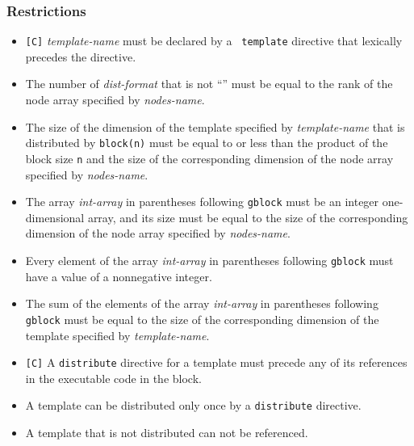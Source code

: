 \subsubsection*{Restrictions}

\begin{itemize}
 \item \verb![C]! {\it template-name} must be declared by a {\tt
       template} directive that lexically precedes the directive.
 \item The number of {\it dist-format} that is not ``{\tt *}'' must be
       equal to the rank of the node array specified by {\it nodes-name}.  
 \item The size of the dimension of the template specified by {\it
       template-name} that is distributed by {\tt block(n)} must be
       equal to or less than the product of the block size {\tt n} and
       the size of the corresponding dimension of the node array
       specified by {\it nodes-name}.
 \item The array {\it int-array} in parentheses following {\tt gblock}
       must be an integer one-dimensional array, and its size must be
       equal to the size of the corresponding dimension of the node array
       specified by {\it nodes-name}.
 \item Every element of the array {\it int-array} in parentheses
       following {\tt gblock} must have a value of a nonnegative integer.
 \item The sum of the elements of the array {\it int-array} in 
       parentheses following {\tt gblock} must be equal to the size of
       the corresponding dimension of the template specified by {\it
       template-name}.
 \item \verb![C]! A {\tt distribute} directive for a template must
       precede any of its references in the executable code in the block.
\item A template can be distributed only once by a {\tt distribute} directive.
\item A template that is not distributed can not be referenced.
\end{itemize}

